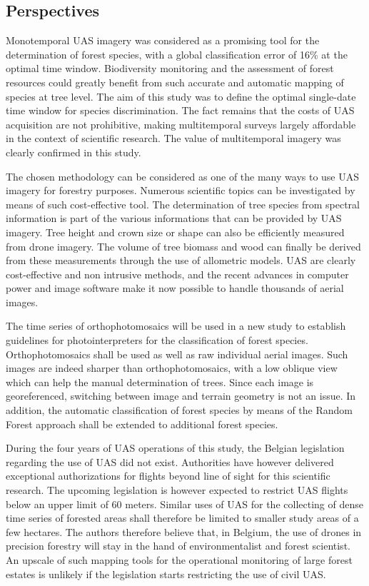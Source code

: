 \documentclass[remotesensing,article,submit,moreauthors,pdftex,12pt,a4paper]{mdpi} %
\begin{document}
\subsection{Perspectives}

Monotemporal UAS imagery was considered as a promising tool for the determination of forest species, with a global classification error of 16\% at the optimal time window. 
Biodiversity monitoring and the assessment of forest resources could greatly benefit from such accurate and automatic mapping of species at tree level. 
The aim of this study was to define the optimal single-date time window for species discrimination. 
The fact remains that the costs of UAS acquisition are not prohibitive, making multitemporal surveys largely affordable in the context of scientific research. 
The value of multitemporal imagery was clearly confirmed in this study.

The chosen methodology can be considered as one of the many ways to use UAS imagery for forestry purposes. 
Numerous scientific topics can be investigated by means of such cost-effective tool. 
The determination of tree species from spectral information is part of the various informations that can be provided by UAS imagery. 
Tree height and crown size or shape can also be efficiently measured from drone imagery. 
The volume of tree biomass and wood can finally be derived from these measurements through the use of allometric models.
UAS are clearly cost-effective and non intrusive methods, and the recent advances in computer power and image software make it now possible to handle thousands of aerial images.

The time series of orthophotomosaics will be used in a new study to establish guidelines for photointerpreters for the classification of forest species. 
Orthophotomosaics shall be used as well as raw individual aerial images. 
Such images are indeed sharper than orthophotomosaics, with a low oblique view which can help the manual determination of trees. 
Since each image is georeferenced, switching between image and terrain geometry is not an issue. 
In addition, the automatic classification of forest species by means of the Random Forest approach shall be extended to additional forest species.

During the four years of UAS operations of this study, the Belgian legislation regarding the use of UAS did not exist. 
Authorities have however delivered exceptional authorizations for flights beyond line of sight for this scientific research. 
The upcoming legislation is however expected to restrict UAS flights below an upper limit of 60 meters. 
Similar uses of UAS for the collecting of dense time series of forested areas shall therefore be limited to smaller study areas of a few hectares. 
The authors therefore believe that, in Belgium, the use of drones in precision forestry will stay in the hand of environmentalist and forest scientist. 
An upscale of such mapping tools for the operational monitoring of large forest estates is unlikely if the legislation starts restricting the use of civil UAS. 
\end{document}
